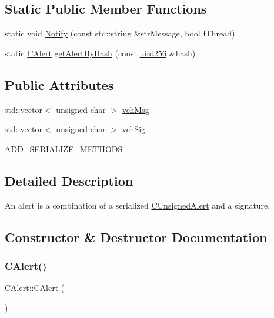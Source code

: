 \subsection*{Static Public Member Functions}
\begin{DoxyCompactItemize}
\item 
static void \mbox{\hyperlink{class_c_alert_a3da23857c8ed275621ee032a703c04a1}{Notify}} (const std\+::string \&str\+Message, bool f\+Thread)
\item 
static \mbox{\hyperlink{class_c_alert}{C\+Alert}} \mbox{\hyperlink{class_c_alert_aa37df9d177a6841ec5fa1e611c42b968}{get\+Alert\+By\+Hash}} (const \mbox{\hyperlink{classuint256}{uint256}} \&hash)
\end{DoxyCompactItemize}
\subsection*{Public Attributes}
\begin{DoxyCompactItemize}
\item 
std\+::vector$<$ unsigned char $>$ \mbox{\hyperlink{class_c_alert_abfcb3b339d052cd3dd6670b03286758a}{vch\+Msg}}
\item 
std\+::vector$<$ unsigned char $>$ \mbox{\hyperlink{class_c_alert_a541b49670ebf387a5f8b7de59277fed0}{vch\+Sig}}
\item 
\mbox{\hyperlink{class_c_alert_aca9310112e67fb38ef88f385a4ac6fc0}{A\+D\+D\+\_\+\+S\+E\+R\+I\+A\+L\+I\+Z\+E\+\_\+\+M\+E\+T\+H\+O\+DS}}
\end{DoxyCompactItemize}


\subsection{Detailed Description}
An alert is a combination of a serialized \mbox{\hyperlink{class_c_unsigned_alert}{C\+Unsigned\+Alert}} and a signature. 

\subsection{Constructor \& Destructor Documentation}
\mbox{\label{class_c_alert_a116117e2318b9468a5ca80472c0b5157}} 
\subsubsection{\texorpdfstring{C\+Alert()}{CAlert()}}
{\footnotesize\ttfamily C\+Alert\+::\+C\+Alert (\begin{DoxyParamCaption}{ }\end{DoxyParamCaption})\hspace{0.3cm}{\ttfamily [inline]}}



